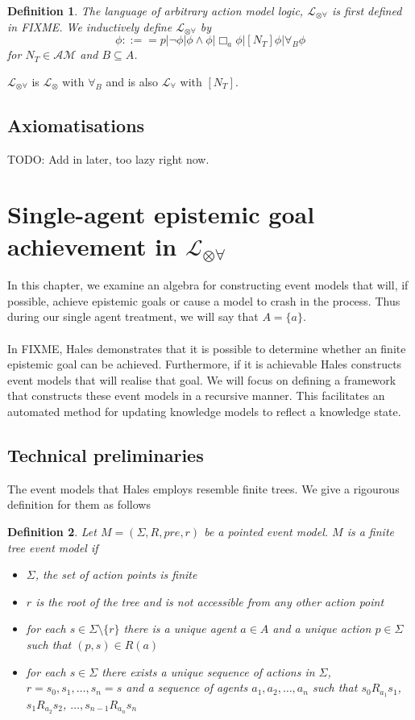 \documentclass[12pt, a4paper, titlepage]{scrartcl}
\newtheorem{defn}{Definition}[section]
\numberwithin{equation}{section}
\newcommand{\lang}{\mathcal{L}}
\newcommand{\langRefine}{\lang_{\forall}}
\newcommand{\langActEx}{\lang_{\otimes}}
\newcommand{\langArbAct}{\lang_{\otimes\forall}}
\newcommand{\eventClass}{\mathcal{AM}}
\begin{document}
\begin{defn} \label{arbActLogic}
The language of arbitrary action model logic, $\langArbAct$ is first defined in FIXME.
We inductively define $\langArbAct$ by
\[
	\phi ::== p | \neg \phi | \phi \land \phi | \Box_a \phi | [ N_T ] \phi | \forall_B \phi
\]
for $N_T \in \eventClass$ and $B \subseteq A$.
\end{defn}
$\langArbAct$ is $\langActEx$ with $\forall_B$ and is also $\langRefine$ with $[ N_T ]$.


\subsection{Axiomatisations}

TODO: Add in later, too lazy right now.

\section{Single-agent epistemic goal achievement in $\langArbAct$}

In this chapter, we examine an algebra for constructing event models that will, if possible, achieve
epistemic goals or cause a model to crash in the process.
Thus during our single agent treatment, we will say that $A = \{a\}$.\\
\\
In FIXME, Hales demonstrates that it is possible to determine whether an
finite epistemic goal can be achieved.
Furthermore, if it is achievable Hales constructs event models that will realise
that goal.
We will focus on defining a framework that constructs these event models in a
recursive manner.
This facilitates an automated method for updating knowledge models to reflect a
knowledge state.

\subsection{Technical preliminaries}

The event models that Hales employs resemble finite trees.
We give a rigourous definition for them as follows

\begin{defn} \label{finTree}
Let $M = (\Sigma, R, pre, r)$ be a pointed event model.
$M$ is a finite tree event model if
\begin{itemize}
	\item $\Sigma$, the set of action points is finite
	\item $r$ is the root of the tree and is not accessible from any other action point
	\item for each $s \in \Sigma \setminus \{ r \}$ there is a unique agent $a \in A$ and a unique
	action $p \in \Sigma$ such that $(p,s) \in R(a)$
	\item for each $s \in \Sigma$ there exists a unique sequence of actions in $\Sigma$, $r = s_0,
	s_1, \ldots, s_n = s$ and a sequence of agents $a_1, a_2, \ldots, a_n$ such that $s_0 R_{a_1}
	s_1$, $s_1 R_{a_2} s_2$, $\ldots, s_{n-1} R_{a_n} s_n$
\end{itemize}
\end{defn}
\end{document}
